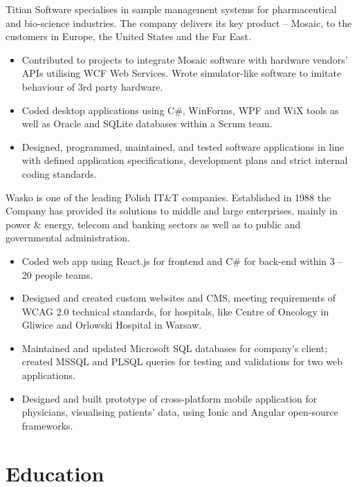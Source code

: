 \documentclass[12pt,english]{resume}
\begin{document}
		Titian Software specialises in sample management systems for pharmaceutical and bio-science industries. The company delivers its key product – Mosaic, to the customers in Europe, the United States and the Far East.
		\begin{itemize}
			\item Contributed to projects to integrate Mosaic software with hardware vendors’ APIs utilising WCF Web Services. Wrote simulator-like software to imitate behaviour of 3rd party hardware.
			\item Coded desktop applications using C\#, WinForms, WPF and WiX tools as well as Oracle and SQLite databases within a Scrum team.
			\item Designed, programmed, maintained, and tested software applications in line with defined application specifications, development plans and strict internal coding standards.
		\end{itemize}
		
		Wasko is one of the leading Polish IT\&T companies. Established in 1988 the Company has provided its solutions to middle and large enterprises, mainly in power \& energy, telecom and banking sectors as well as to public and governmental administration.
		\begin{itemize}
			\item Coded web app using React.js for frontend and C\# for back-end within 3 – 20 people teams.
			\item Designed and created custom websites and CMS, meeting requirements of WCAG 2.0 technical standards, for hospitals, like Centre of Oncology in Gliwice and Orlowski Hospital in Warsaw.
			\item Maintained and updated Microsoft SQL databases for company’s client; created MSSQL and PLSQL queries for testing and validations for two web applications.
			\item Designed and built prototype of cross-platform mobile application for physicians, visualising patients’ data, using Ionic and Angular open-source frameworks.
		\end{itemize}
	
	\section{Education}
\end{document}
